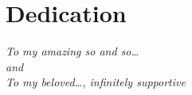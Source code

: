 ﻿\chapter*{Dedication}
\begin{center}
    \vspace*{2cm}
    \textit{To my amazing so and so\dots} \\
    \textit{and} \\
    \textit{To my beloved\dots, infinitely supportive}
\end{center}
